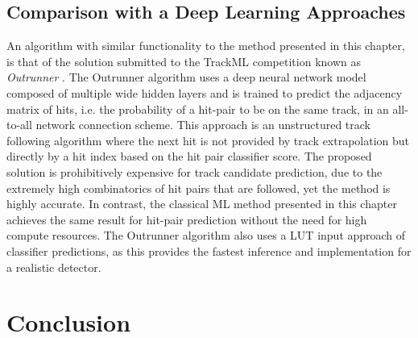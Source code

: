\subsection{Comparison with a Deep Learning Approaches}


An algorithm with similar functionality to the method presented in this chapter, is that of the solution submitted to the TrackML competition known as \textit{Outrunner} \cite{Amrouche_2019}. The Outrunner algorithm uses a deep neural network model composed of multiple wide hidden layers and is trained to predict the adjacency matrix of hits, i.e. the probability of a hit-pair to be on the same track, in an all-to-all network connection scheme. This approach is an unstructured track following algorithm where the next hit is not provided by track extrapolation but directly by a hit index based on the hit pair classifier score. The proposed solution is prohibitively expensive for track candidate prediction, due to the extremely high combinatorics of hit pairs that are followed, yet the method is highly accurate. In contrast, the classical ML method presented in this chapter achieves the same result for hit-pair prediction without the need for high compute resources. The Outrunner algorithm also uses a LUT input approach of classifier predictions, as this provides the fastest inference and implementation for a realistic detector.




\section{Conclusion}

